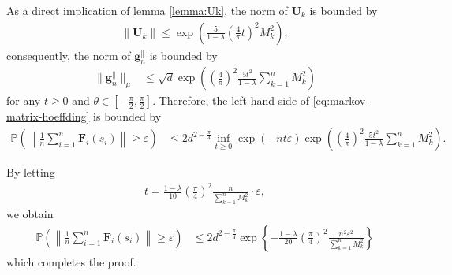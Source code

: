 As a direct implication of lemma \ref{lemma:Uk}, the norm of $\bm{U}_k$ is bounded by
\begin{align*}
\|\bm{U}_k\| \leq \exp\left(\frac{5}{1-\lambda} (\frac{4}{\pi}t)^2 M_k^2\right);
\end{align*}
consequently, the norm of $\bm{g}_n^{\parallel}$ is bounded by
\begin{align*}
\|\bm{g}_n^{\parallel}\|_{\mu} &\leq \sqrt{d}\exp\left(\left(\frac{4}{\pi}\right)^2\frac{5t^2}{1-\lambda} \sum_{k=1}^n M_k^2 \right) 
\end{align*}
for any $t \geq 0$ and $\theta \in \left[-\frac{\pi}{2},\frac{\pi}{2}\right]$. Therefore, the left-hand-side of \eqref{eq:markov-matrix-hoeffding} is bounded by
\begin{align*}
\mathbb{P}\left(\left\|\frac{1}{n}\sum_{i=1}^n \bm{F}_i(s_i)\right\| \geq \varepsilon \right) &\leq   2d^{2-\frac{\pi}{4}} \inf_{t \geq 0}  \exp(-nt\varepsilon)\exp\left(\left(\frac{4}{\pi}\right)^2\frac{5t^2}{1-\lambda} \sum_{k=1}^n M_k^2 \right).
\end{align*}

By letting
\begin{align*}
t = \frac{1-\lambda}{10} \left(\frac{\pi}{4}\right)^2 \frac{n}{\sum_{k=1}^n M_k^2} \cdot \varepsilon,
\end{align*}
we obtain
\begin{align*}
\mathbb{P}\left(\left\|\frac{1}{n}\sum_{i=1}^n \bm{F}_i(s_i)\right\| \geq \varepsilon \right) &\leq 2d^{2-\frac{\pi}{4}} \exp\left\{-\frac{1-\lambda}{20}\left(\frac{\pi}{4}\right)^2\frac{n^2\varepsilon^2 }{\sum_{k=1}^n M_k^2} \right\}
\end{align*}
which completes the proof.



